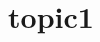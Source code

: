 \documentclass{article}
\begin{document}
\title{topic1}
\author{}
\maketitle
\begin{abstract}
\end{abstract}
\end{document}
